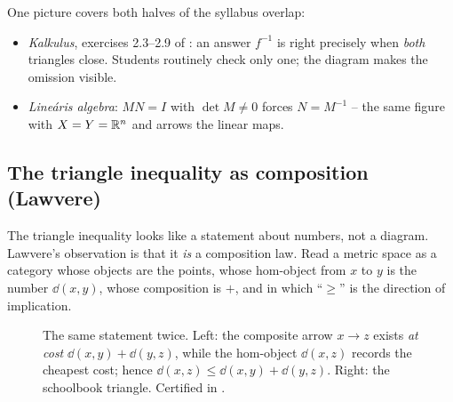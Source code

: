 One picture covers both halves of the syllabus overlap:
\begin{itemize}\itemsep2pt
\item \emph{Kalkulus}, exercises 2.3--2.9 of : an answer
  $f^{-1}$ is right precisely when \emph{both} triangles close. Students routinely check
  only one; the diagram makes the omission visible.
\item \emph{Line\'aris algebra}: $MN=I$ with $\det M\neq 0$ forces $N=M^{-1}$ -- the same
  figure with $X=Y=\mathbb{R}^n$ and arrows the linear maps.
\end{itemize}

\subsection{The triangle inequality as composition (Lawvere)}

The triangle inequality looks like a statement about numbers, not a diagram. Lawvere's
observation is that it \emph{is} a composition law. Read a metric space as a category
whose objects are the points, whose hom-object from $x$ to $y$ is the number $\dd(x,y)$,
whose composition is $+$, and in which ``$\ge$'' is the direction of implication.

\begin{figure}[H]
\centering
{}
\qquad\raisebox{10mm}{$\rightsquigarrow$}\qquad
{}
\caption{The same statement twice. Left: the composite arrow $x\to z$ exists \emph{at
cost} $\dd(x,y)+\dd(y,z)$, while the hom-object $\dd(x,z)$ records the cheapest cost;
hence $\dd(x,z)\le\dd(x,y)+\dd(y,z)$. Right: the schoolbook triangle. Certified in
.}
\label{fig:lawvere}
\end{figure}

